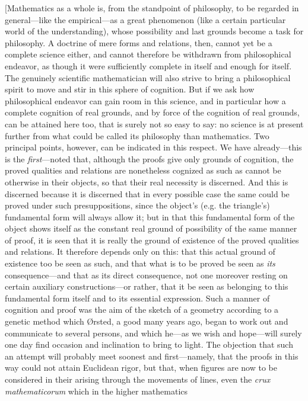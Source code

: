 \documentclass[12pt,a4paper]{book}
\begin{document}
[Mathematics as a whole is, from the standpoint of philosophy, to be regarded in
general---like the empirical---as a great phenomenon (like a certain particular
world of the understanding), whose possibility and last grounds become a task for
philosophy. A doctrine of mere forms and relations, then, cannot yet be a complete
science either, and cannot therefore be withdrawn from philosophical endeavor, as
though it were sufficiently complete in itself and enough for itself. The
genuinely scientific mathematician will also strive to bring a philosophical
spirit to move and stir in this sphere of cognition. But if we ask how
philosophical endeavor can gain room in this science, and in particular how a
complete cognition of real grounds, and by force of the cognition of real grounds,
can be attained here too, that is surely not so easy to say: no science is at
present further from what could be called its philosophy than mathematics. Two
principal points, however, can be indicated in this respect. We have
already---this is the \emph{first}---noted that, although the proofs give only
grounds of cognition, the proved qualities and relations are nonetheless cognized
as such as cannot be otherwise in their objects, so that their real necessity is
discerned. And this is discerned because it is discerned that in every possible
case the same could be proved under such presuppositions, since the object's (e.g.
the triangle's) fundamental form will always allow it; but in that this
fundamental form of the object shows itself as the constant real ground of
possibility of the same manner of proof, it is seen that it is really the ground
of existence of the proved qualities and relations. It therefore depends only on
this: that this actual ground of existence too be seen as such, and that what is
to be proved be seen as \emph{its} consequence---and that as its direct
consequence, not one moreover resting on certain auxiliary constructions---or
rather, that it be seen as belonging to this fundamental form itself and to its
essential expression. Such a manner of cognition and proof was the aim of the
sketch of a geometry according to a genetic method which Ørsted, a good many years
ago, began to work out and communicate to several persons, and which he---as we
wish and hope---will surely one day find occasion and inclination to bring to
light. The objection that such an attempt will probably meet soonest and
first---namely, that the proofs in this way could not attain Euclidean rigor, but
that, when figures are now to be considered in their arising through the movements
of lines, even the \textit{crux mathematicorum} which in the higher mathematics
\end{document}
